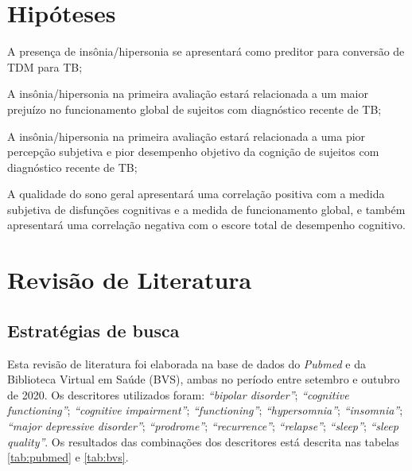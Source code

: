 \documentclass[chapter=TITLE,
               oneside,
               12pt,
               a4paper,
               english,
               brazil]{abntex2}    %
\begin{document}
\vspace{\onelineskip}
\chapter{Hipóteses}\label{sec:hipoteses}

    \begin{alineas}

        \item A presença de insônia/hipersonia se apresentará como preditor
        para conversão de TDM para TB;

        \item A insônia/hipersonia na primeira avaliação estará relacionada
        a um maior prejuízo no funcionamento global de sujeitos com diagnóstico
        recente de TB;

        \item A insônia/hipersonia na primeira avaliação estará relacionada
        a uma pior percepção subjetiva e pior desempenho objetivo da cognição
        de sujeitos com diagnóstico recente de TB;

        \item A qualidade do sono geral apresentará uma correlação
        positiva com a medida subjetiva de disfunções cognitivas e a medida de
        funcionamento global, e também apresentará uma correlação negativa com
        o escore total de desempenho cognitivo.

    \end{alineas}

\vspace{\onelineskip}
\chapter{Revisão de Literatura}\label{sec:revisao}

    \section{Estratégias de busca}\label{sec:estrategias}

        Esta revisão de literatura foi elaborada na base de dados do \textit{Pubmed}
        e da Biblioteca Virtual em Saúde (BVS), ambas no período entre setembro e
        outubro de 2020.
        Os descritores utilizados foram: \textit{``bipolar disorder''};
        \textit{``cognitive functioning''}; \textit{``cognitive impairment''};
        \textit{``functioning''}; \textit{``hypersomnia''};
        \textit{``insomnia''}; \textit{``major depressive disorder''};
        \textit{``prodrome''}; \textit{``recurrence''}; \textit{``relapse''};
        \textit{``sleep''}; \textit{``sleep quality''}.
        Os resultados das combinações dos descritores está descrita nas tabelas
        \ref{tab:pubmed} e \ref{tab:bvs}.
    
\end{document}
